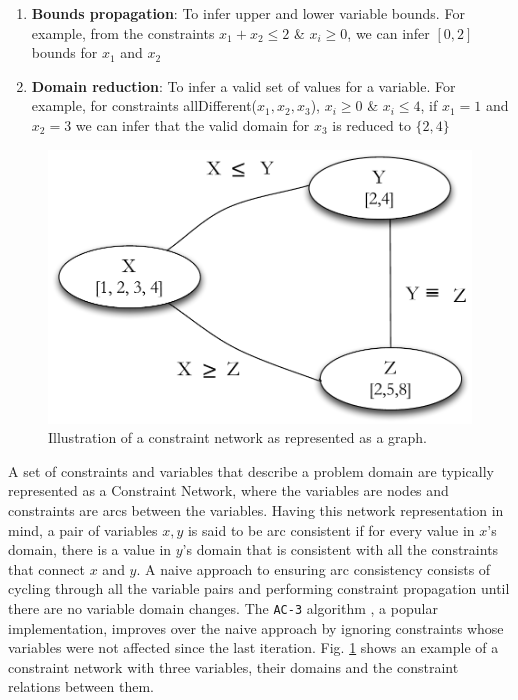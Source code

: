 {\begin{enumerate}
\item \textbf{Bounds propagation}: To infer upper and lower variable
  bounds. For example, from the constraints $x_1 + x_2 \leq 2$ \&
  $x_i \geq 0$, we can infer $[0,2]$ bounds for $x_1$ and $x_2$

\item \textbf{Domain reduction}: To infer a valid set of values for a variable.
  For example, for  constraints allDifferent($x_1,x_2,x_3$), $x_i \geq
  0$ \& $x_i \leq 4$, if $x_1 = 1$ and $x_2 = 3$ we can infer that the
  valid domain for $x_3$ is reduced  to $\{2,4\}$

\end{enumerate}

\begin{figure}[!t]
\centering
\includegraphics[scale=0.35]{figs/constraint-net.pdf}
\caption{\small Illustration of a constraint network as represented as
a graph.}
\label{fig:constraintnet}
\end{figure}


A set of constraints and variables that describe a problem domain are
typically represented as a Constraint Network, where the variables are
nodes and constraints are arcs between the variables. Having this
network representation in mind, a pair of variables $x,y$ is said to
be arc consistent if for every value in $x$'s domain, there is a value
in $y$'s domain that is consistent with all the constraints that
connect $x$ and $y$.  A naive approach to ensuring arc consistency
consists of cycling through all the variable pairs and performing
constraint propagation until there are no variable domain changes. The
\texttt{AC-3} algorithm \cite{mackworth77}, a popular implementation,
improves over the naive approach by ignoring constraints whose
variables were not affected since the last
iteration. Fig. \ref{fig:constraintnet} shows an example of a
constraint network with three variables, their domains and the
constraint relations between them.

}
